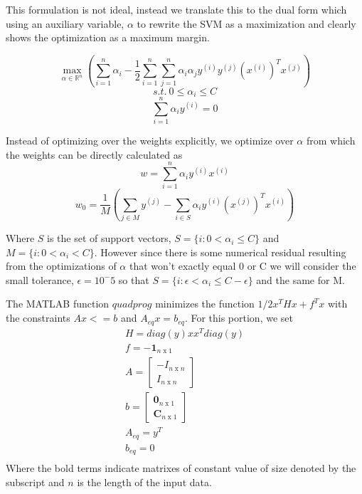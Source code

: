 \documentclass[12pt, twocolumn]{article}
\begin{document}
    
This formulation is not ideal, instead we translate this to the dual form which using an auxiliary variable, $\alpha$ to rewrite the SVM as a maximization and clearly shows the optimization as a maximum margin. 

\begin{equation}
\max_{\alpha \in \mathbb{R}^n} ( \sum_{i=1}^n \alpha_i - \frac{1}{2} \sum_{i=1}^n \sum_{j=1}^n \alpha_i \alpha_j y^{(i)} y^{(j)} (x^{(i)})^T x^{(j)})
\end{equation}
\begin{equation}
s.t. \: 0 \leq \alpha_i \leq C
\end{equation}
\begin{equation}
\sum_{i=1}^n \alpha_i y^{(i)} =0
\end{equation}

Instead of optimizing over the weights explicitly, we optimize over $\alpha$ from which the weights can be directly calculated as 
\begin{equation}
w= \sum_{i=1}^n \alpha_i y^{(i)}x^{(i)}
\end{equation}  
\begin{equation}
w_0= \frac{1}{M} ( \sum_{j \in M} y^{(j)} - \sum_{i \in S} \alpha_i y^{(i)}(x^{(j)})^Tx^{(i)})
\end{equation}

Where $S$ is the set of support vectors, $S=\{i : 0 < \alpha_i \leq C \}$ and $M = \{i : 0 < \alpha_i < C \}$. However since there is some numerical residual resulting from the optimizations of $\alpha$ that won't exactly equal 0 or C we will consider the small tolerance, $\epsilon= 10^-5$ so that  $S=\{i : \epsilon < \alpha_i \leq C-\epsilon \}$ and the same for M.

The MATLAB function $quadprog$ minimizes the function $1/2 x^T H x + f^T x$ with the constraints $Ax <= b$ and $A_{eq}x = b_{eq}$. For this portion, we set 
\begin{gather*}
H = diag(y)xx^Tdiag(y)\\
f = -\mathbf{1} _{n \; \textrm{x} \; 1}\\
A = \begin{bmatrix}-I_{n \; \textrm{x} \; n} \\ I_{n \; \textrm{x} \; n} \end{bmatrix}\\
b = \begin{bmatrix}  \mathbf{0} _{n \; \textrm{x} \; 1}\\  \mathbf{C} _{n \; \textrm{x} \; 1} \end{bmatrix}\\
A_{eq} = y^T\\
b_{eq} = 0\\
\end{gather*}
Where the bold terms indicate matrixes of constant value of size denoted by the subscript and $n$ is the length of the input data. 
\end{document}
